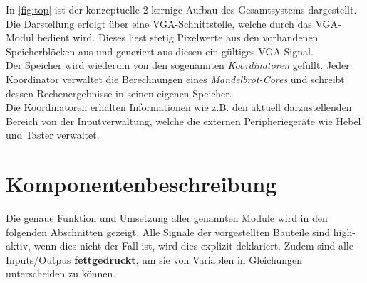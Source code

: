 \documentclass[a4paper,12pt,onesided]{report}
\begin{document}
In \autoref{fig:top} ist der konzeptuelle 2-kernige Aufbau des Gesamtsystems dargestellt.\\
Die Darstellung erfolgt über eine VGA-Schnittstelle, welche durch das VGA-Modul bedient wird.
Dieses liest stetig Pixelwerte aus den vorhandenen Speicherblöcken aus und generiert aus diesen ein gültiges VGA-Signal.\\
Der Speicher wird wiederum von den sogenannten \textit{Koordinatoren} gefüllt.
Jeder Koordinator verwaltet die Berechnungen eines \textit{Mandelbrot-Cores} und schreibt dessen Rechenergebnisse in seinen eigenen Speicher.\\
Die Koordinatoren erhalten Informationen wie z.B. den aktuell darzustellenden Bereich von der Inputverwaltung, welche die externen Peripheriegeräte wie Hebel und Taster verwaltet.\\

\section{Komponentenbeschreibung}
Die genaue Funktion und Umsetzung aller genannten Module wird in den folgenden Abschnitten gezeigt.
Alle Signale der vorgestellten Bauteile sind high-aktiv, wenn dies nicht der Fall ist, wird dies explizit deklariert.
Zudem sind alle Inputs/Outpus \textbf{fettgedruckt}, um sie von Variablen in Gleichungen unterscheiden zu können.
\end{document}
